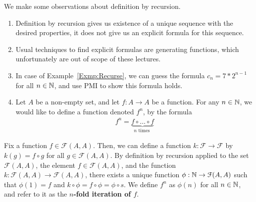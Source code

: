 \documentclass[a4paper,english,12pt]{article}
\begin{document}
\begin{rem} We make some observations about definition by recursion.
\begin{enumerate}
	\item Definition by recursion gives us existence of a unique sequence with the desired properties, it does not give us an explicit formula for this sequence. %
	\item Usual techniques to find explicit formulas are generating functions, which unfortunately are out of scope of these lectures.
	\item In case of Example~\ref{Exmp:Recurse}, we can guess the formula $c_n=7*2^{n-1}$ for all $n \in \mathbb{N}$, and use PMI to show this formula holds. 
	\item Let $A$ be a non-empty set, and let $f : A \to A$ be a function. For any $n \in \mathbb{N}$, we would like to define a function denoted $f^n$, by the formula
\begin{align*}
	f^n=\underbrace{f\circ \ldots \circ f}_{n \text{ times }}
\end{align*}
\end{enumerate}
\end{rem}
\begin{defn} Fix a function $f \in \mathcal{F}(A,A)$. Then, we can define a function $k: \mathcal{F}\to \mathcal{F}$  by $k(g) = f \circ g$ for all $g\in \mathcal{F}(A,A)$. By definition by recursion applied to the set $\mathcal{F}(A,A)$, the element $f \in \mathcal{F}(A,A)$, and the function $k: \mathcal{F}(A,A) \to \mathcal{F}(A,A)$, there exists a unique function $\phi : \mathbb{N} \to \mathcal{F}(A,A)$ such that $\phi(1) = f$ and %
$k \circ \phi = f \circ \phi = \phi \circ s$. We define $f^n$ as $\phi(n)$ for all $n \in \mathbb{N}$, and refer to it as the \textbf{$n$-fold iteration of $f$}.
\end{defn}
\end{document}
